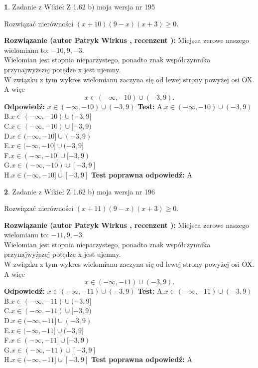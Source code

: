 \documentclass[12pt, a4paper]{article}
\theoremstyle{definition} %
\newtheorem{zad}{}
\newcommand{\zadStart}[1]{\begin{zad}#1\newline}
\newcommand{\zadStop}{\end{zad}}
\newcommand{\rozwStart}[2]{\noindent \textbf{Rozwiązanie (autor #1 , recenzent #2): }\newline}
\newcommand{\rozwStop}{\newline}
\newcommand{\odpStart}{\noindent \textbf{Odpowiedź:}\newline}
\newcommand{\odpStop}{\newline}
\newcommand{\testStart}{\noindent \textbf{Test:}\newline}
\newcommand{\testStop}{\newline}
\newcommand{\kluczStart}{\noindent \textbf{Test poprawna odpowiedź:}\newline}
\newcommand{\kluczStop}{\newline}
\begin{document}
\zadStart{Zadanie z Wikieł Z 1.62 b) moja wersja nr 195}

Rozwiązać nierówności $(x+10)(9-x)(x+3)\ge0$.
\zadStop
\rozwStart{Patryk Wirkus}{}
Miejsca zerowe naszego wielomianu to: $-10, 9, -3$.\\
Wielomian jest stopnia nieparzystego, ponadto znak współczynnika przy\linebreak najwyższej potędze x jest ujemny.\\ W związku z tym wykres wielomianu zaczyna się od lewej strony powyżej osi OX. A więc $$x \in (-\infty,-10) \cup (-3,9).$$
\rozwStop
\odpStart
$x \in (-\infty,-10) \cup (-3,9)$
\odpStop
\testStart
A.$x \in (-\infty,-10) \cup (-3,9)$\\
B.$x \in (-\infty,-10) \cup (-3,9]$\\
C.$x \in (-\infty,-10) \cup [-3,9)$\\
D.$x \in (-\infty,-10] \cup (-3,9)$\\
E.$x \in (-\infty,-10] \cup (-3,9]$\\
F.$x \in (-\infty,-10] \cup [-3,9)$\\
G.$x \in (-\infty,-10) \cup [-3,9]$\\
H.$x \in (-\infty,-10] \cup [-3,9]$
\testStop
\kluczStart
A
\kluczStop



\zadStart{Zadanie z Wikieł Z 1.62 b) moja wersja nr 196}

Rozwiązać nierówności $(x+11)(9-x)(x+3)\ge0$.
\zadStop
\rozwStart{Patryk Wirkus}{}
Miejsca zerowe naszego wielomianu to: $-11, 9, -3$.\\
Wielomian jest stopnia nieparzystego, ponadto znak współczynnika przy\linebreak najwyższej potędze x jest ujemny.\\ W związku z tym wykres wielomianu zaczyna się od lewej strony powyżej osi OX. A więc $$x \in (-\infty,-11) \cup (-3,9).$$
\rozwStop
\odpStart
$x \in (-\infty,-11) \cup (-3,9)$
\odpStop
\testStart
A.$x \in (-\infty,-11) \cup (-3,9)$\\
B.$x \in (-\infty,-11) \cup (-3,9]$\\
C.$x \in (-\infty,-11) \cup [-3,9)$\\
D.$x \in (-\infty,-11] \cup (-3,9)$\\
E.$x \in (-\infty,-11] \cup (-3,9]$\\
F.$x \in (-\infty,-11] \cup [-3,9)$\\
G.$x \in (-\infty,-11) \cup [-3,9]$\\
H.$x \in (-\infty,-11] \cup [-3,9]$
\testStop
\kluczStart
A
\kluczStop
\end{document}
